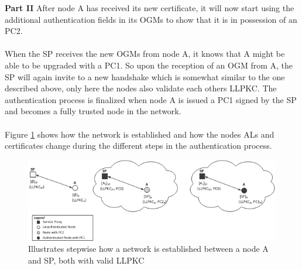 \noindent
\textbf{Part II} After node A has received its new certificate, it will now start using the additional authentication fields in its OGMs to show that it is in possession of an PC2. %
\\\\
When the SP receives the new OGMs from node A, it knows that A might be able to be upgraded with a PC1. So upon the reception of an OGM from A, the SP will again invite to a new handshake which is somewhat similar to the one described above, only here the nodes also validate each others LLPKC. The authentication process is finalized when node A is issued a PC1 signed by the SP and becomes a fully trusted node in the network.
\\\\
Figure \ref{fig:first_env} shows how the network is established and how the nodes ALs and certificates change during the different steps in the authentication process.

\begin{figure}[ht]
	\centering
		\includegraphics{images/simple_first_env_tot.png}
	\caption{Illustrates stepwise how a network is established between a node A and SP, both with valid LLPKC}
	\label{fig:first_env}
\end{figure}

